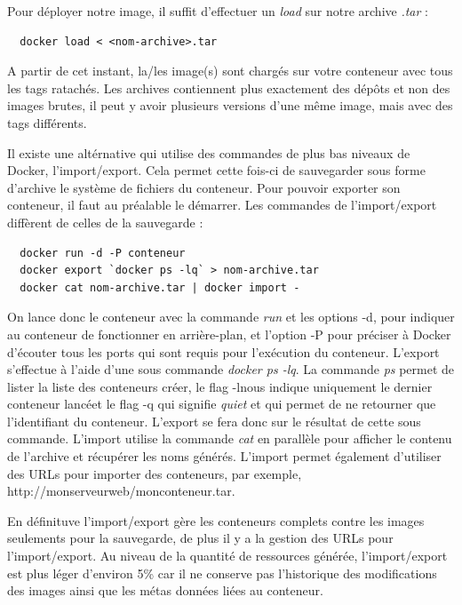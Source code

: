 \documentclass[12pt,a4paper]{article}
\begin{document}
Pour déployer notre image, il suffit d'effectuer un \textit{load} sur notre archive \textit{.tar} :

\begin{lstlisting}
  docker load < <nom-archive>.tar
\end{lstlisting}

A partir de cet instant, la/les image(s) sont chargés sur votre conteneur avec tous les tags ratachés. Les archives contiennent plus exactement des dépôts et non des images brutes, il peut y avoir plusieurs versions d'une même image, mais avec des tags différents.

Il existe une altérnative qui utilise des commandes de plus bas niveaux de Docker, l'import/export. Cela permet cette fois-ci de sauvegarder sous forme d'archive le système de fichiers du conteneur. Pour pouvoir exporter son conteneur, il faut au préalable le démarrer. Les commandes de l'import/export diffèrent de celles de la sauvegarde :

\begin{lstlisting}
  docker run -d -P conteneur
  docker export `docker ps -lq` > nom-archive.tar
  docker cat nom-archive.tar | docker import -
\end{lstlisting}

On lance donc le conteneur avec la commande \textit{run} et les options -d, pour indiquer au conteneur de fonctionner en arrière-plan, et l'option -P pour préciser à Docker d'écouter tous les ports qui sont requis pour l'exécution du conteneur. L'export s'effectue à l'aide d'une sous commande \textit{docker ps -lq}. La commande \textit{ps} permet de lister la liste des conteneurs créer, le flag -lnous indique uniquement le dernier conteneur lancéet le flag -q qui signifie \textit{quiet} et qui permet de ne retourner que l'identifiant du conteneur. L'export se fera donc sur le résultat de cette sous commande. L'import utilise la commande \textit{cat} en parallèle pour afficher le contenu de l'archive et récupérer les noms générés. L'import permet également d'utiliser des URLs pour importer des conteneurs, par exemple, http://monserveurweb/monconteneur.tar.

En définituve l'import/export gère les conteneurs complets contre les images seulements pour la sauvegarde, de plus il y a la gestion des URLs pour l'import/export. Au niveau de la quantité de ressources générée, l'import/export est plus léger d'environ 5\% car il ne conserve pas l'historique des modifications des images ainsi que les métas données liées au conteneur.
\end{document}
